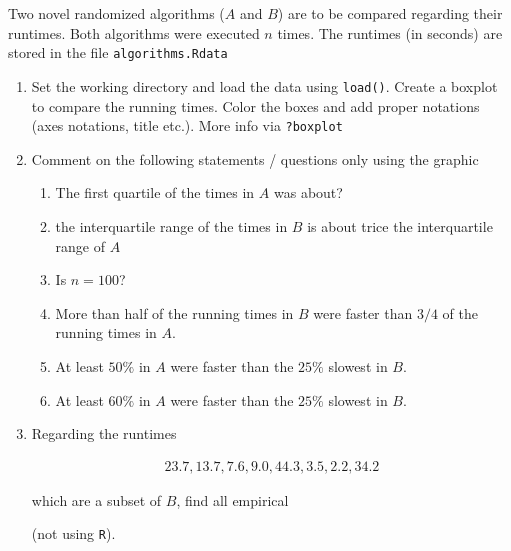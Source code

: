 
\begin{exercise}

Two novel randomized algorithms ($A$ and $B$) are to be compared regarding their runtimes.
Both algorithms were executed $n$ times.
The runtimes (in seconds) are stored in the file \texttt{algorithms.Rdata}

\begin{enumerate}[label = (\alph*)]

    \item Set the working directory and load the data using \texttt{load()}.
    Create a boxplot to compare the running times.
    Color the boxes and add proper notations (axes notations, title etc.).
    More info via \texttt{?boxplot}

    \item Comment on the following statements / questions only using the graphic
    
    \begin{enumerate}[label = (\alph*)]
        \item The first quartile of the times in $A$ was about?
        \item the interquartile range of the times in $B$ is about trice the interquartile range of $A$
        \item Is $n = 100$?
        \item More than half of the running times in $B$ were faster than $3/4$ of the running times in $A$.
        \item At least $50 \%$ in $A$ were faster than the $25 \%$ slowest in $B$.
        \item At least $60 \%$ in $A$ were faster than the $25 \%$ slowest in $B$.
    \end{enumerate}

    \item Regarding the runtimes
    
    \begin{align*}
        23.7, 13.7, 7.6, 9.0, 44.3, 3.5, 2.2, 34.2
    \end{align*}

    which are a subset of $B$, find all empirical
    (not using \texttt R).

\end{enumerate}

\end{exercise}

